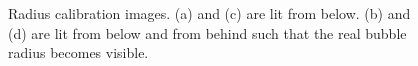 \begin{figure}
				\caption{Radius calibration images. (a) and (c) are lit from below. (b) and (d) are lit from below and from behind such that the real bubble radius becomes visible. }
				\label{fig:radius_calibration_setup_result}
			\end{figure}

































